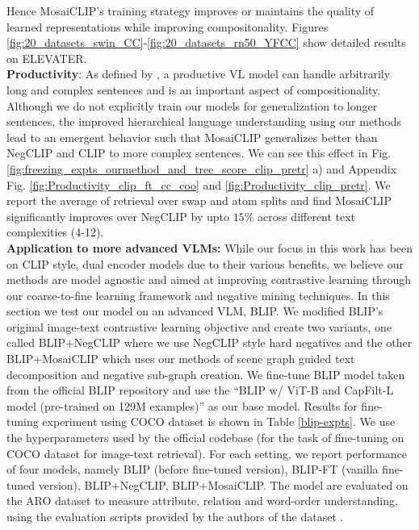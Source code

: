 \documentclass[11pt]{article}
\newcommand{\methodcomp}{MosaiCLIP}
\newcommand{\clip}{CLIP}
\newcommand{\negclip}{NegCLIP}
\begin{document}
Hence \methodcomp{}'s training strategy improves or maintains the quality of learned representations while improving compositonality. Figures \ref{fig:20_datasets_swin_CC}-\ref{fig:20_datasets_rn50_YFCC} show detailed results on ELEVATER.\\
\newline
\noindent \textbf{Productivity}:
As defined by \citet{ma2022crepe}, a productive VL model can handle arbitrarily long and complex sentences and is an important aspect of compositionality. Although we do not explicitly train our models for generalization to longer sentences, the improved hierarchical language understanding using our methods lead to an emergent behavior such that \methodcomp{} generalizes better than \negclip{} and \clip{} to more complex sentences. We can see this effect in Fig. \ref{fig:freezing_expts_ourmethod_and_tree_score_clip_pretr} a) and Appendix Fig. \ref{fig:Productivity_clip_ft_cc_coo} and \ref{fig:Productivity_clip_pretr}. We report the average of retrieval over swap and atom splits and find \methodcomp{} significantly improves over \negclip{} by upto $15\%$ across different text complexities (4-12). \\
\newline
\noindent \textbf{Application to more advanced VLMs:}
While our focus in this work has been on CLIP style, dual encoder models due to their various benefits, we believe our methods are model agnostic and aimed at improving contrastive learning through our coarse-to-fine learning framework and negative mining techniques. In this section we test our model on an advanced VLM, BLIP.
We modified BLIP’s original image-text contrastive learning objective and create two variants, one called BLIP+NegCLIP where we use NegCLIP style hard negatives and the other BLIP+MosaiCLIP which uses our methods of scene graph guided text decomposition and negative sub-graph creation. We fine-tune BLIP model taken from the official BLIP repository and use the “BLIP w/ ViT-B and CapFilt-L model (pre-trained on 129M examples)” as our base model. Results for fine-tuning experiment using COCO dataset is shown in Table \ref{blip-expts}. We use the hyperparameters used by the official codebase (for the task of fine-tuning on COCO dataset for image-text retrieval). For each setting, we report performance of four models, namely BLIP (before fine-tuned version), BLIP-FT (vanilla fine-tuned version), BLIP+NegCLIP, BLIP+MosaiCLIP. The model are evaluated on the ARO dataset to measure attribute, relation and word-order understanding, using the evaluation scripts provided by the authors of the dataset \citep{yuksekgonul2022and}.
\end{document}
